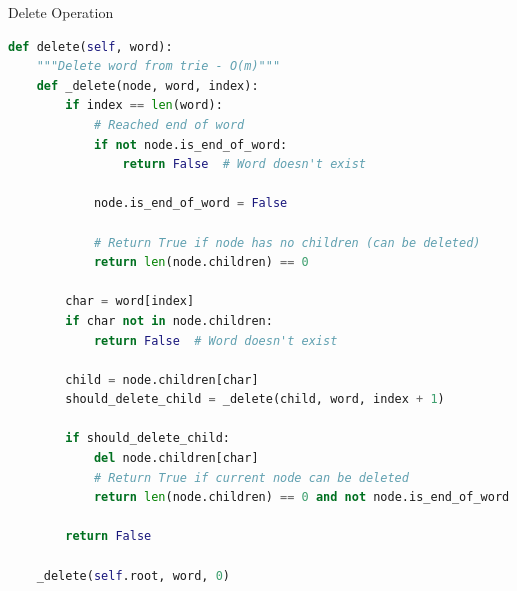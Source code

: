 \documentclass[aspectratio=169]{beamer}
\begin{document}
\begin{frame}[fragile]{Delete Operation}
  \begin{lstlisting}[language=Python, basicstyle=\ttfamily\footnotesize]
def delete(self, word):
    """Delete word from trie - O(m)"""
    def _delete(node, word, index):
        if index == len(word):
            # Reached end of word
            if not node.is_end_of_word:
                return False  # Word doesn't exist

            node.is_end_of_word = False

            # Return True if node has no children (can be deleted)
            return len(node.children) == 0

        char = word[index]
        if char not in node.children:
            return False  # Word doesn't exist

        child = node.children[char]
        should_delete_child = _delete(child, word, index + 1)

        if should_delete_child:
            del node.children[char]
            # Return True if current node can be deleted
            return len(node.children) == 0 and not node.is_end_of_word

        return False

    _delete(self.root, word, 0)
  \end{lstlisting}
\end{frame}
\end{document}
